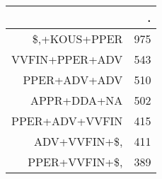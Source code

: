 \begin{tabular}{rr}
  \hline
 & . \\ 
  \hline
\$,+KOUS+PPER & 975 \\ 
  VVFIN+PPER+ADV & 543 \\ 
  PPER+ADV+ADV & 510 \\ 
  APPR+DDA+NA & 502 \\ 
  PPER+ADV+VVFIN & 415 \\ 
  ADV+VVFIN+\$, & 411 \\ 
  PPER+VVFIN+\$, & 389 \\ 
   \hline
\end{tabular}
